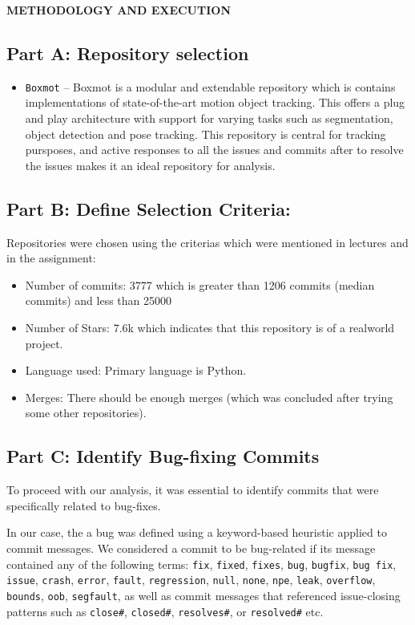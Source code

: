 \documentclass[12pt,a4paper]{article}
\newcommand{\sectionbar}[1]{%
  \vspace{0.6\baselineskip}%
  \noindent
  \colorbox{sectionbar}{%
    \parbox{\dimexpr\linewidth-2\fboxsep\relax}{%
      \textbf{\Large\textsf{#1}}%
    }%
  }%
  \vspace{0.6\baselineskip}
}
\begin{document}
\newpage
\sectionbar{METHODOLOGY AND EXECUTION}

\subsection*{Part A: Repository selection}
\begin{itemize}
        \item \texttt{Boxmot} -- Boxmot is a modular and extendable repository which is contains implementations of state-of-the-art motion object tracking. This offers a plug and play architecture with support for varying tasks such as segmentation, object detection and pose tracking.
        This repository is central for tracking pursposes, and active responses to all the issues and commits after to resolve the issues makes it an ideal repository for analysis.

    \end{itemize}

\subsection*{Part B: Define Selection Criteria:}

Repositories were chosen using the criterias which were mentioned in lectures and in the assignment:
\begin{itemize}
    \item {Number of commits}: 3777 which is greater than 1206 commits (median commits) and less than 25000
    \item {Number of Stars}: 7.6k which indicates that this repository is of a real\-world project.
    \item {Language used}: Primary language is Python.
    \item {Merges}: There should be enough merges (which was concluded after trying some other repositories).
\end{itemize}


\subsection*{Part C: Identify Bug-fixing Commits}

To proceed with our analysis, it was essential to identify commits that were specifically related to bug-fixes.

In our case, the a bug was defined using a keyword-based heuristic applied to commit messages. We considered a commit to be bug-related if its message contained any of the following terms:  
\texttt{fix}, \texttt{fixed}, \texttt{fixes}, \texttt{bug}, \texttt{bugfix}, \texttt{bug fix}, \texttt{issue}, \texttt{crash}, \texttt{error}, \texttt{fault}, \texttt{regression}, \texttt{null}, \texttt{none}, \texttt{npe}, \texttt{leak}, \texttt{overflow}, \texttt{bounds}, \texttt{oob}, \texttt{segfault}, as well as commit messages that referenced issue-closing patterns such as \texttt{close\#}, \texttt{closed\#}, \texttt{resolves\#}, or \texttt{resolved\#} etc.
\end{document}
